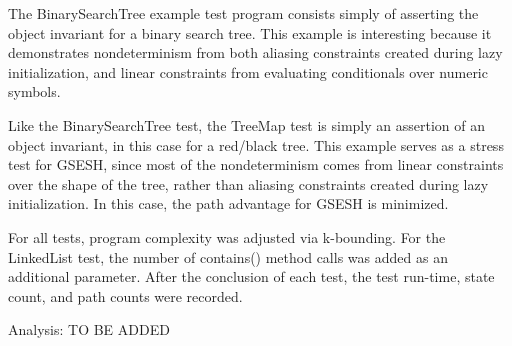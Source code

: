 The BinarySearchTree example test program consists simply of asserting the object invariant for a binary search tree. This example is interesting because it demonstrates nondeterminism from both aliasing constraints created during lazy initialization, and linear constraints from evaluating conditionals over numeric symbols. 

Like the BinarySearchTree test, the TreeMap test is simply an assertion of an object invariant, in this case for a red/black tree. This example serves as a stress test for GSESH, since most of the nondeterminism comes from linear constraints over the shape of the tree, rather than aliasing constraints created during lazy initialization. In this case, the path advantage for GSESH is minimized.

For all tests, program complexity was adjusted via k-bounding. For the LinkedList test, the number of contains() method calls was added as an additional parameter. After the conclusion of each test, the test run-time, state count, and path counts were recorded. 

Analysis: TO BE ADDED